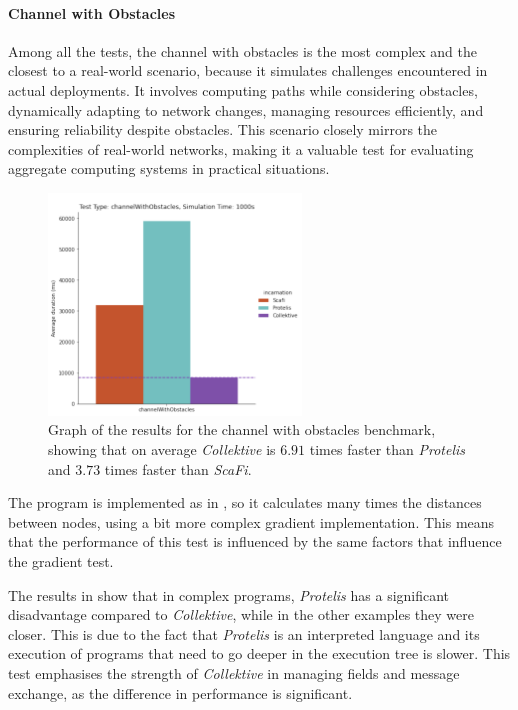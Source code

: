 \paragraph{Channel with Obstacles}
Among all the tests, the channel with obstacles is the most complex and the closest to a real-world scenario,
because it simulates challenges encountered in actual deployments.
It involves computing paths while considering obstacles, dynamically adapting to network changes, managing resources
efficiently, and ensuring reliability despite obstacles.
This scenario closely mirrors the complexities of real-world networks, making it a valuable test for evaluating aggregate
computing systems in practical situations.

\begin{figure}[ht!]
    \centering
    \includegraphics[width=0.6\textwidth]{figures/channel-results}
    \caption{Graph of the results for the channel with obstacles benchmark, showing that on average \emph{Collektive} is $6.91$ times faster
    than \emph{Protelis} and $3.73$ times faster than \emph{ScaFi}.}
    \label{fig:channel-with-obstacles}
\end{figure}

The program is implemented as in , so it calculates many times the distances
between nodes, using a bit more complex gradient implementation.
This means that the performance of this test is influenced by the same factors that influence the gradient test.

The results in  show that in complex programs, \emph{Protelis} has a significant
disadvantage compared to \emph{Collektive}, while in the other examples they were closer.
This is due to the fact that \emph{Protelis} is an interpreted language and its execution of programs that need to go
deeper in the execution tree is slower.
This test emphasises the strength of \emph{Collektive} in managing fields and message exchange, as the difference in
performance is significant.

